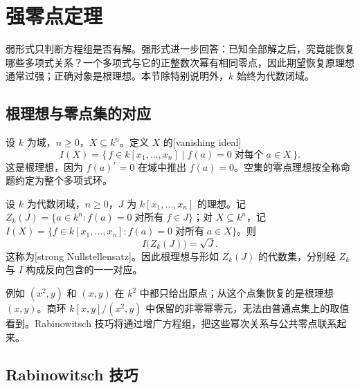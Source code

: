 
\section{强零点定理}\label{b3:sec:0603}

弱形式只判断方程组是否有解。强形式进一步回答：已知全部解之后，究竟能恢复哪些多项式关系？一个多项式与它的正整数次幂有相同零点，因此期望恢复原理想通常过强；正确对象是根理想。本节除特别说明外，\(k\) 始终为代数闭域。

\subsection{根理想与零点集的对应}\label{b3:subsec:0603:01}

设 \(k\) 为域，\(n\ge0\)，\(X\subseteq k^n\)。定义 \(X\) 的[vanishing ideal]
\[
	I(X)=\bigl\{\,f\in k[x_1,\ldots,x_n]\mid f(a)=0\;\text{对每个}\;a\in X\,\bigr\}.
\]
这是根理想，因为 \(f(a)^r=0\) 在域中推出 \(f(a)=0\)。空集的零点理想按全称命题约定为整个多项式环。

\begin{theorem}\label{b3:thm:strong-nullstellensatz}
	设 \(k\) 为代数闭域，\(n\ge0\)，\(J\) 为 \(k[x_1,\ldots,x_n]\) 的理想。记 \(Z_k(J)=\{a\in k^n:f(a)=0\;\text{对所有}\;f\in J\}\)；对 \(X\subseteq k^n\)，记 \(I(X)=\{f\in k[x_1,\ldots,x_n]:f(a)=0\;\text{对所有}\;a\in X\}\)。则
	\[
		I\bigl(Z_k(J)\bigr)=\sqrt J.
	\]
	这称为[strong Nullstellensatz]。因此根理想与形如 \(Z_k(J)\) 的代数集，分别经 \(Z_k\) 与 \(I\) 构成反向包含的一一对应。
\end{theorem}

例如 \((x^2,y)\) 和 \((x,y)\) 在 \(k^2\) 中都只给出原点；从这个点集恢复的是根理想 \((x,y)\)。商环 \(k[x,y]/(x^2,y)\) 中保留的非零幂零元，无法由普通点集上的取值看到。Rabinowitsch 技巧将通过增广方程组，把这些幂次关系与公共零点联系起来。

\subsection{Rabinowitsch 技巧}\label{b3:subsec:0603:02}

